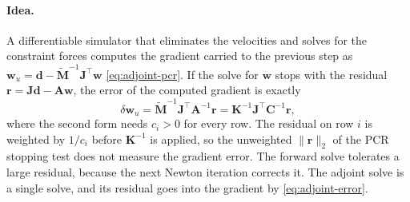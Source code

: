 \paragraph{Idea.}
A differentiable simulator that eliminates the velocities and solves for
the constraint forces computes the gradient carried to the previous step
as $\mathbf{w}_u = \mathbf{d} - \tilde{\mathbf{M}}^{-1}\mathbf{J}^\top\mathbf{w}$
\eqref{eq:adjoint-pcr}. If the solve for $\mathbf{w}$ stops with the
residual $\mathbf{r} = \mathbf{J}\mathbf{d} - \mathbf{A}\mathbf{w}$, the
error of the computed gradient is exactly
\begin{equation}
  \delta\mathbf{w}_u
  = \tilde{\mathbf{M}}^{-1}\mathbf{J}^\top\mathbf{A}^{-1}\mathbf{r}
  = \mathbf{K}^{-1}\mathbf{J}^\top\mathbf{C}^{-1}\mathbf{r} ,
  \label{eq:adjoint-error}
\end{equation}
where the second form needs $c_i > 0$ for every row. The residual on row
$i$ is weighted by $1/c_i$ before $\mathbf{K}^{-1}$ is applied, so the
unweighted $\|\mathbf{r}\|_2$ of the PCR stopping test does not measure
the gradient error. The forward solve tolerates a large residual, because
the next Newton iteration corrects it. The adjoint solve is a single
solve, and its residual goes into the gradient by \eqref{eq:adjoint-error}.

